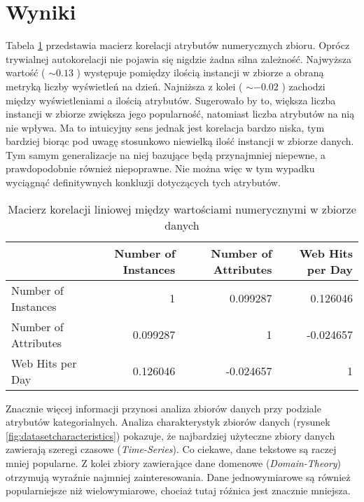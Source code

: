 \section{Wyniki}

Tabela \ref{tab:correlation} przedstawia macierz korelacji atrybutów numerycznych zbioru.
Oprócz trywialnej autokorelacji nie pojawia się nigdzie żadna silna zależność.
Najwyższa wartość ( \( \sim 0.13 \) ) występuje pomiędzy ilością instancji w zbiorze a obraną metryką liczby wyświetleń na dzień.
Najniższa z kolei ( \( \sim -0.02 \) ) zachodzi między wyświetleniami a ilością atrybutów.
Sugerowało by to, większa liczba instancji w zbiorze zwiększa jego popularność, natomiast liczba atrybutów na nią nie wpływa.
Ma to intuicyjny sens jednak jest korelacja bardzo niska, tym bardziej biorąc pod uwagę stosunkowo niewielką ilość instancji w zbiorze danych.
Tym samym generalizacje na niej bazujące będą przynajmniej niepewne, a prawdopodobnie również niepoprawne.
Nie można więc w tym wypadku wyciągnąć definitywnych konkluzji dotyczących tych atrybutów.

\begin{center}
  \begin{table}[ht]
    \begin{tabular}{|l|rrr|}
      \hline
                           & Number of Instances & Number of Attributes & Web Hits per Day \\
      \hline
      Number of Instances  & 1                   & 0.099287             & 0.126046         \\
      Number of Attributes & 0.099287            & 1                    & -0.024657        \\
      Web Hits per Day     & 0.126046            & -0.024657            & 1                \\
      \hline
    \end{tabular}
    \caption{Macierz korelacji liniowej między wartościami numerycznymi w zbiorze danych}
    \label{tab:correlation}
  \end{table}
\end{center}

Znacznie więcej informacji przynosi analiza zbiorów danych przy podziale atrybutów kategorialnych.
Analiza charakterystyk zbiorów danych (rysunek \ref{fig:datasetcharacteristics}) pokazuje, że najbardziej użyteczne zbiory danych zawierają szeregi czasowe (\emph{Time-Series}).
Co ciekawe, dane tekstowe są raczej mniej popularne.
Z kolei zbiory zawierające dane domenowe (\emph{Domain-Theory}) otrzymują wyraźnie najmniej zainteresowania.
Dane jednowymiarowe są również popularniejsze niż wielowymiarowe, chociaż tutaj różnica jest znacznie mniejsza.


